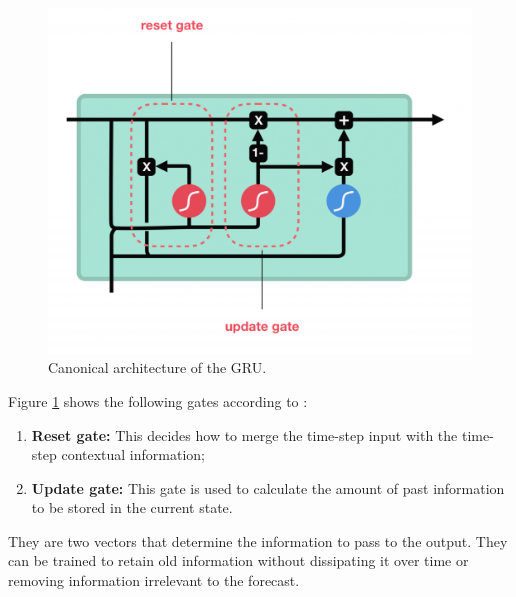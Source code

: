 \documentclass[conference]{IEEEtran}
\begin{document}
\begin{figure}[htbp]
\centerline{\includegraphics[scale=0.2]{images/gru.png}}
\caption{Canonical architecture of the GRU.}
\label{fig6}
\end{figure}

Figure \ref{fig6} shows the following gates according to \cite{b6}:
\begin{enumerate}
    \item \textbf{Reset gate:} This decides how to merge the time-step input with the time-step contextual information;
    \item \textbf{Update gate:} This gate is used to calculate the amount of past information to be stored in the current state.
\end{enumerate}

They are two vectors that determine the information to pass to the output. They can be trained to retain old information without dissipating it over time or removing information irrelevant to the forecast.
\end{document}

